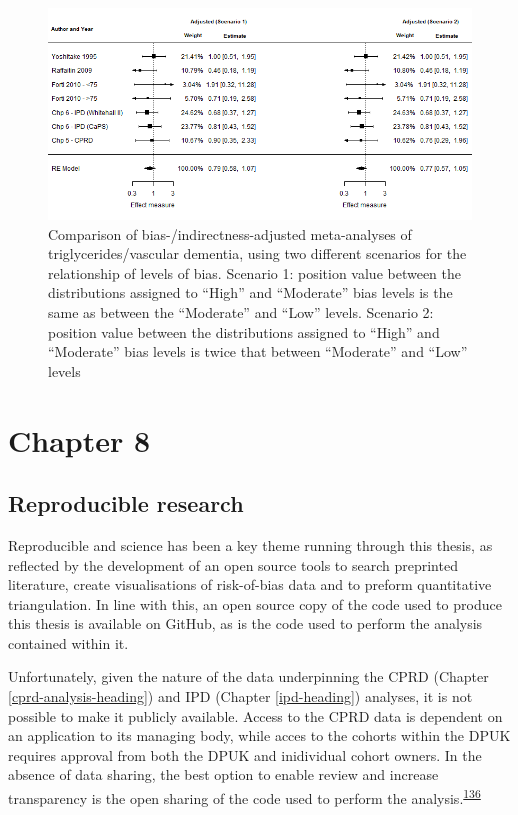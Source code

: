 \documentclass[a4paper, twoside]{templates/ociamthesis}
\begin{document}
\begin{figure}[H]
\includegraphics[width=1\linewidth]{figures/tri/fp_paired_midlife_tg_vad_scenarios} \caption[Comparison of bias-/indirectness-adjusted meta-analyses under two different scenarios of prior distributions of bias.]{Comparison of bias-/indirectness-adjusted meta-analyses of triglycerides/vascular dementia, using two different scenarios for the relationship of levels of bias. Scenario 1: position value between the distributions assigned to ``High'' and ``Moderate'' bias levels is the same as between the ``Moderate'' and ``Low'' levels. Scenario 2: position value between the distributions assigned to ``High'' and ``Moderate'' bias levels is twice that between ``Moderate'' and ``Low'' levels}\label{fig:fpTgVaDComparison}
\end{figure}

\hypertarget{chapter-8}{%
\section{Chapter 8}\label{chapter-8}}

\hypertarget{disc-repro-research}{%
\subsection{Reproducible research}\label{disc-repro-research}}

Reproducible and science has been a key theme running through this thesis, as reflected by the development of an open source tools to search preprinted literature, create visualisations of risk-of-bias data and to preform quantitative triangulation. In line with this, an open source copy of the code used to produce this thesis is available on GitHub, as is the code used to perform the analysis contained within it.

Unfortunately, given the nature of the data underpinning the CPRD (Chapter \ref{cprd-analysis-heading}) and IPD (Chapter \ref{ipd-heading}) analyses, it is not possible to make it publicly available. Access to the CPRD data is dependent on an application to its managing body, while acces to the cohorts within the DPUK requires approval from both the DPUK and inidividual cohort owners. In the absence of data sharing, the best option to enable review and increase transparency is the open sharing of the code used to perform the analysis.\textsuperscript{\protect\hyperlink{ref-goldacre2019}{136}}
\end{document}
